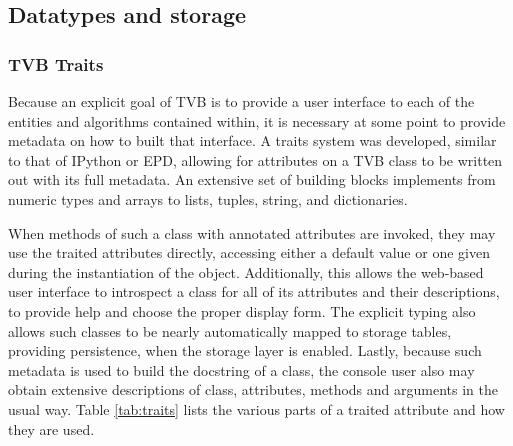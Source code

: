 %
%
%
%
%
%


\subsection{Datatypes and storage}

\subsubsection{TVB Traits}

Because an explicit goal of TVB is to provide a user interface to each of the
entities and algorithms contained within, it is necessary at some point to
provide metadata on how to built that interface. A traits system was
developed, similar to that of IPython or EPD, allowing for
attributes on a TVB class to be written out with its full metadata. An extensive
set of building blocks implements from numeric types and arrays to
lists, tuples, string, and dictionaries.



When methods of such a class with annotated attributes are invoked, they may use
the traited attributes directly, accessing either a default value or one given
during the instantiation of the object. Additionally, this allows the web-based
user interface to introspect a class for all of its attributes and their
descriptions, to provide help and choose the proper display form. The explicit
typing also allows such classes to be nearly automatically mapped to storage
tables, providing persistence, when the storage layer is enabled.  Lastly,
because such metadata is used to build the docstring of a class, the console
user also may obtain extensive descriptions of class, attributes, methods and
arguments in the usual way. Table \ref{tab:traits} lists the various parts 
of a traited attribute and how they are used. 


